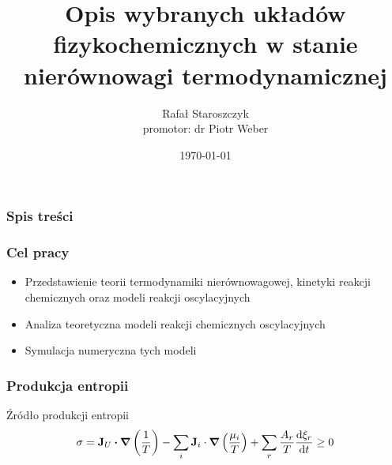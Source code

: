 \documentclass{beamer}
\title{Opis wybranych układów fizykochemicznych w stanie nierównowagi termodynamicznej}
\author{Rafał Staroszczyk\\promotor: dr Piotr Weber}
\institute{Politechnika Gdańska}
\date{\today}
\begin{document}

\begin{frame}
\titlepage
\end{frame}

\begin{frame}
\frametitle{Spis treści}
\tableofcontents
\end{frame}

\begin{frame}
\frametitle{Cel pracy}
\begin{itemize}
\item Przedstawienie teorii termodynamiki nierównowagowej, kinetyki reakcji chemicznych oraz modeli reakcji oscylacyjnych
\item Analiza teoretyczna modeli reakcji chemicznych oscylacyjnych
\item Symulacja numeryczna tych modeli
\end{itemize}
\end{frame}

\begin{frame}
\frametitle{Produkcja entropii}
\begin{block}{Źródło produkcji entropii}
\begin{equation*}
\sigma=\vb{J}_{U}\vdot\grad{\left(\frac{1}{T}\right)}-\sum_{i}\vb{J}_{i}\cdot\grad{\left(\frac{\mu_{i}}{T}\right)}+\sum_{r}\frac{A_{r}}{T}\dv{\xi_{r}}{t}\geq0
\end{equation*}
\end{block}
\end{frame}
\end{document}
